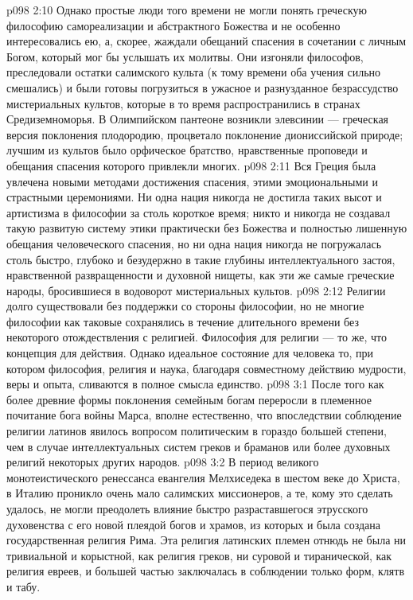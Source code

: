 \vs p098 2:10 \pc Однако простые люди того времени не могли понять греческую философию самореализации и абстрактного Божества и не особенно интересовались ею, а, скорее, жаждали обещаний спасения в сочетании с личным Богом, который мог бы услышать их молитвы. Они изгоняли философов, преследовали остатки салимского культа (к тому времени оба учения сильно смешались) и были готовы погрузиться в ужасное и разнузданное безрассудство мистериальных культов, которые в то время распространились в странах Средиземноморья. В Олимпийском пантеоне возникли элевсинии --- греческая версия поклонения плодородию, процветало поклонение диониссийской природе; лучшим из культов было орфическое братство, нравственные проповеди и обещания спасения которого привлекли многих.
\vs p098 2:11 Вся Греция была увлечена новыми методами достижения спасения, этими эмоциональными и страстными церемониями. Ни одна нация никогда не достигла таких высот и артистизма в философии за столь короткое время; никто и никогда не создавал такую развитую систему этики практически без Божества и полностью лишенную обещания человеческого спасения, но ни одна нация никогда не погружалась столь быстро, глубоко и безудержно в такие глубины интеллектуального застоя, нравственной развращенности и духовной нищеты, как эти же самые греческие народы, бросившиеся в водоворот мистериальных культов.
\vs p098 2:12 \pc Религии долго существовали без поддержки со стороны философии, но не многие философии как таковые сохранялись в течение длительного времени без некоторого отождествления с религией. Философия для религии --- то же, что концепция для действия. Однако идеальное состояние для человека то, при котором философия, религия и наука, благодаря совместному действию мудрости, веры и опыта, сливаются в полное смысла единство.
\vs p098 3:1 После того как более древние формы поклонения семейным богам переросли в племенное почитание бога войны Марса, вполне естественно, что впоследствии соблюдение религии латинов явилось вопросом политическим в гораздо большей степени, чем в случае интеллектуальных систем греков и браманов или более духовных религий некоторых других народов.
\vs p098 3:2 В период великого монотеистического ренессанса евангелия Мелхиседека в шестом веке до Христа, в Италию проникло очень мало салимских миссионеров, а те, кому это сделать удалось, не могли преодолеть влияние быстро разраставшегося этрусского духовенства с его новой плеядой богов и храмов, из которых и была создана государственная религия Рима. Эта религия латинских племен отнюдь не была ни тривиальной и корыстной, как религия греков, ни суровой и тиранической, как религия евреев, и большей частью заключалась в соблюдении только форм, клятв и табу.
